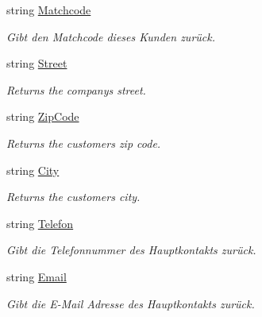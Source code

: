 \begin{DoxyCompactItemize}
string \hyperlink{class_products_1_1_model_1_1_entities_1_1_kunde_a7ec637ef2ac0da91f1be956673442ff2}{Matchcode}
\begin{DoxyCompactList}\small\item\em Gibt den Matchcode dieses Kunden zurück. \end{DoxyCompactList}\item 
string \hyperlink{class_products_1_1_model_1_1_entities_1_1_kunde_ac8d44806c21f1470c0631b0702143a16}{Street}
\begin{DoxyCompactList}\small\item\em Returns the company\textquotesingle{}s street. \end{DoxyCompactList}\item 
string \hyperlink{class_products_1_1_model_1_1_entities_1_1_kunde_aa6bf1bacab6e3cce382a1c1d197219ec}{Zip\+Code}
\begin{DoxyCompactList}\small\item\em Returns the customer\textquotesingle{}s zip code. \end{DoxyCompactList}\item 
string \hyperlink{class_products_1_1_model_1_1_entities_1_1_kunde_a18c3d169d6fc639d6d45a53c8b3ce43c}{City}
\begin{DoxyCompactList}\small\item\em Returns the customer\textquotesingle{}s city. \end{DoxyCompactList}\item 
string \hyperlink{class_products_1_1_model_1_1_entities_1_1_kunde_ac5fb33edecc600bbbcf1a4f15466079c}{Telefon}
\begin{DoxyCompactList}\small\item\em Gibt die Telefonnummer des Hauptkontakts zurück. \end{DoxyCompactList}\item 
string \hyperlink{class_products_1_1_model_1_1_entities_1_1_kunde_a5db7b37310aeab89c2ab6bb9e4c610e9}{Email}
\begin{DoxyCompactList}\small\item\em Gibt die E-\/\+Mail Adresse des Hauptkontakts zurück. \end{DoxyCompactList}\item 

\end{DoxyCompactItemize}
